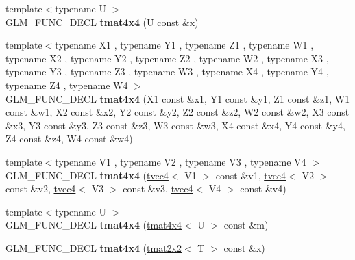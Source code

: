 \begin{DoxyCompactItemize}
\item 
\hypertarget{structglm_1_1detail_1_1tmat4x4_a7bba4efd49aa5ada36597d70b6bed499}{}{\footnotesize template$<$typename U $>$ }\\G\+L\+M\+\_\+\+F\+U\+N\+C\+\_\+\+D\+E\+C\+L {\bfseries tmat4x4} (U const \&x)\label{structglm_1_1detail_1_1tmat4x4_a7bba4efd49aa5ada36597d70b6bed499}

\item 
\hypertarget{structglm_1_1detail_1_1tmat4x4_a4c61a1ac0a751a92864d43c76ae7c838}{}{\footnotesize template$<$typename X1 , typename Y1 , typename Z1 , typename W1 , typename X2 , typename Y2 , typename Z2 , typename W2 , typename X3 , typename Y3 , typename Z3 , typename W3 , typename X4 , typename Y4 , typename Z4 , typename W4 $>$ }\\G\+L\+M\+\_\+\+F\+U\+N\+C\+\_\+\+D\+E\+C\+L {\bfseries tmat4x4} (X1 const \&x1, Y1 const \&y1, Z1 const \&z1, W1 const \&w1, X2 const \&x2, Y2 const \&y2, Z2 const \&z2, W2 const \&w2, X3 const \&x3, Y3 const \&y3, Z3 const \&z3, W3 const \&w3, X4 const \&x4, Y4 const \&y4, Z4 const \&z4, W4 const \&w4)\label{structglm_1_1detail_1_1tmat4x4_a4c61a1ac0a751a92864d43c76ae7c838}

\item 
\hypertarget{structglm_1_1detail_1_1tmat4x4_ad3cd8b58ae5da286e76933dc8f1f709e}{}{\footnotesize template$<$typename V1 , typename V2 , typename V3 , typename V4 $>$ }\\G\+L\+M\+\_\+\+F\+U\+N\+C\+\_\+\+D\+E\+C\+L {\bfseries tmat4x4} (\hyperlink{structglm_1_1detail_1_1tvec4}{tvec4}$<$ V1 $>$ const \&v1, \hyperlink{structglm_1_1detail_1_1tvec4}{tvec4}$<$ V2 $>$ const \&v2, \hyperlink{structglm_1_1detail_1_1tvec4}{tvec4}$<$ V3 $>$ const \&v3, \hyperlink{structglm_1_1detail_1_1tvec4}{tvec4}$<$ V4 $>$ const \&v4)\label{structglm_1_1detail_1_1tmat4x4_ad3cd8b58ae5da286e76933dc8f1f709e}

\item 
\hypertarget{structglm_1_1detail_1_1tmat4x4_ae796af70313184b6ca417007ab3df53d}{}{\footnotesize template$<$typename U $>$ }\\G\+L\+M\+\_\+\+F\+U\+N\+C\+\_\+\+D\+E\+C\+L {\bfseries tmat4x4} (\hyperlink{structglm_1_1detail_1_1tmat4x4}{tmat4x4}$<$ U $>$ const \&m)\label{structglm_1_1detail_1_1tmat4x4_ae796af70313184b6ca417007ab3df53d}

\item 
\hypertarget{structglm_1_1detail_1_1tmat4x4_a5ec3b38d6d69a8874513859052404851}{}G\+L\+M\+\_\+\+F\+U\+N\+C\+\_\+\+D\+E\+C\+L {\bfseries tmat4x4} (\hyperlink{structglm_1_1detail_1_1tmat2x2}{tmat2x2}$<$ T $>$ const \&x)\label{structglm_1_1detail_1_1tmat4x4_a5ec3b38d6d69a8874513859052404851}


\end{DoxyCompactItemize}
